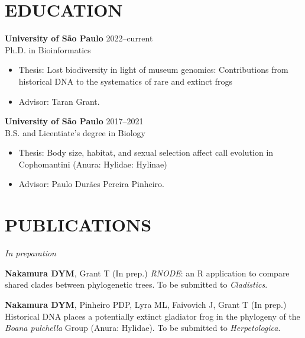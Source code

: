 \documentclass[margin, 10pt]{res} %
\begin{document}
\begin{resume}
 
\section{EDUCATION}

\textbf{University of São Paulo} \hfill 2022--current \\
Ph.D. in Bioinformatics
\begin{itemize}
\item Thesis: Lost biodiversity in light of museum genomics: Contributions from historical DNA to the systematics of rare and extinct frogs
\item Advisor: Taran Grant.
\end{itemize} 

\textbf{University of São Paulo} \hfill 2017--2021 \\
B.S. and Licentiate's degree in Biology
\begin{itemize}
\item Thesis: Body size, habitat, and sexual selection affect call evolution in Cophomantini (Anura: Hylidae: Hylinae)
\item Advisor: Paulo Durães Pereira Pinheiro.
\end{itemize} 


\section{PUBLICATIONS}
{\sl In preparation}
\begin{etaremune}
\item \textbf{Nakamura DYM}, Grant T (In prep.) \emph{RNODE}: an R application to compare shared clades between phylogenetic trees. To be submitted to \emph{Cladistics}. 
\item \textbf{Nakamura DYM}, Pinheiro PDP, Lyra ML, Faivovich J, Grant T (In prep.) Historical DNA places a potentially extinct gladiator frog in the phylogeny of the \emph{Boana pulchella} Group (Anura: Hylidae). To be submitted to \emph{Herpetologica}. 
\end{etaremune}


\end{resume}
\end{document}
